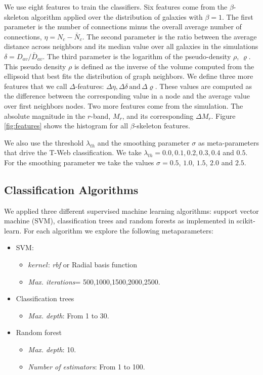 \documentclass[usenatbib]{mnras}
\begin{document}
We use eight features to train the classifiers.
Six features come from the $\beta$-skeleton algorithm applied over the distribution
of galaxies with $\beta=1$.
The first parameter is the number of connections minus the overall average number of
connections, $\eta = N_c - \bar{N}_c$. 
The second parameter is the ratio between the average distance across neighbors and its median
value over all galaxies in the simulations $\delta=D_{av}/\bar{D}_{av}$.
The third parameter is the logarithm of the pseudo-density $\rho$, $\varrho$. 
This pseudo density $\rho$ is defined as the inverse of the volume computed from the ellipsoid that best fits the distribution of graph neighbors.
We define three more features that we call $\Delta$-features: $\Delta\eta,\Delta\delta\,\text{and}\,\Delta\varrho$. 
These values are computed as the difference between the corresponding value in a node and the 
average value over first neighbors nodes.
Two more features come from the simulation. The absolute magnitude in the 
$r$-band, $M_r$, and its corresponding $\Delta M_r$.
Figure \ref{fig:features} shows the histogram for all $\beta$-skeleton features.

We also use the threshold $\lambda_{th}$ and the smoothing parameter $\sigma$ as
meta-parameters that drive the T-Web classification. 
We take $\lambda_{th}=0.0, 0.1, 0.2, 0.3, 0.4$ and $0.5$.
For the smoothing parameter we take the values $\sigma=0.5$, $1.0$, $1.5$, $2.0$ and $2.5$. 


\subsection{Classification Algorithms}

We applied three different supervised machine learning algorithms: support vector machine (SVM),
classification trees and random forests as implemented in scikit-learn. 
 For each algorithm we explore the following metaparameters:
\begin{itemize}
    \item SVM: 
        \begin{itemize}
            \item $kernel$: \textit{rbf} or Radial basis function
            \item \textit{Max. iterations}= 500,1000,1500,2000,2500.
        \end{itemize}
    \item Classification trees
        \begin{itemize}
            \item \textit{Max. depth}: From 1 to 30.
        \end{itemize}
    \item Random forest
        \begin{itemize}
            \item \textit{Max. depth}: 10.
            \item \textit{Number of estimators}: From 1 to 100.
        \end{itemize}
\end{itemize}
\end{document}
